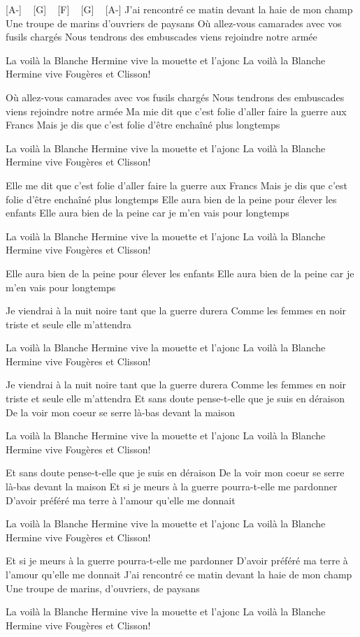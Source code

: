 [A-] ~ [G] ~ [F] ~ [G] ~ [A-]
J'ai rencontré ce matin devant la haie de mon champ
Une troupe de marins d'ouvriers de paysans
Où allez-vous camarades avec vos fusils chargés
Nous tendrons des embuscades viens rejoindre notre armée


La voilà la Blanche Hermine vive la mouette et l'ajonc
La voilà la Blanche Hermine vive Fougères et Clisson!

Où allez-vous camarades avec vos fusils chargés
Nous tendrons des embuscades viens rejoindre notre armée
Ma mie dit que c'est folie d'aller faire la guerre aux Francs
Mais je dis que c'est folie d'être enchaîné plus longtemps

La voilà la Blanche Hermine vive la mouette et l'ajonc
La voilà la Blanche Hermine vive Fougères et Clisson!


Elle me dit que c'est folie d'aller faire la guerre aux Francs
Mais je dis que c'est folie d'être enchaîné plus longtemps
Elle aura bien de la peine pour élever les enfants
Elle aura bien de la peine car je m'en vais pour longtemps

La voilà la Blanche Hermine vive la mouette et l'ajonc
La voilà la Blanche Hermine vive Fougères et Clisson!

Elle aura bien de la peine pour élever les enfants
Elle aura bien de la peine car je m'en vais pour longtemps

Je viendrai à la nuit noire tant que la guerre durera
Comme les femmes en noir triste et seule elle m'attendra

La voilà la Blanche Hermine vive la mouette et l'ajonc
La voilà la Blanche Hermine vive Fougères et Clisson!

Je viendrai à la nuit noire tant que la guerre durera
Comme les femmes en noir triste et seule elle m'attendra
Et sans doute pense-t-elle que je suis en déraison
De la voir mon coeur se serre là-bas devant la maison


La voilà la Blanche Hermine vive la mouette et l'ajonc
La voilà la Blanche Hermine vive Fougères et Clisson!

Et sans doute pense-t-elle que je suis en déraison
De la voir mon coeur se serre là-bas devant la maison
Et si je meurs à la guerre pourra-t-elle me pardonner
D'avoir préféré ma terre à l'amour qu'elle me donnait

La voilà la Blanche Hermine vive la mouette et l'ajonc
La voilà la Blanche Hermine vive Fougères et Clisson!


Et si je meurs à la guerre pourra-t-elle me pardonner
D'avoir préféré ma terre à l'amour qu'elle me donnait
J'ai rencontré ce matin devant la haie de mon champ
Une troupe de marins, d'ouvriers, de paysans

La voilà la Blanche Hermine vive la mouette et l'ajonc
La voilà la Blanche Hermine vive Fougères et Clisson! 